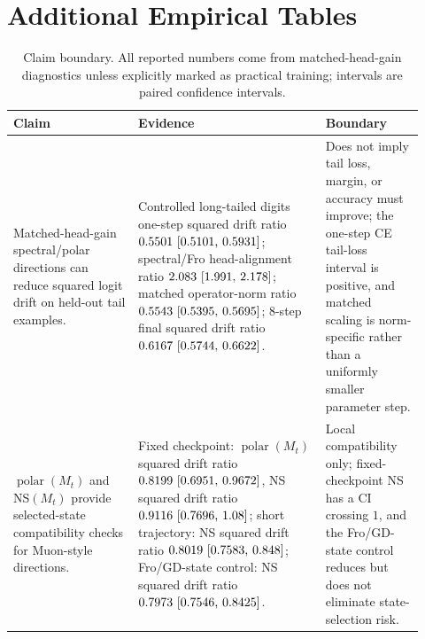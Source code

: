 \documentclass{article}
\theoremstyle{definition}
\newcommand{\polar}{\operatorname{polar}}
\begin{document}
\clearpage
\section{Additional Empirical Tables}
\label{app:appendix-tables}

\begin{table}[H]
\centering
\caption{Claim boundary. All reported numbers come from matched-head-gain diagnostics unless explicitly marked as practical training; intervals are paired confidence intervals.}
\label{tab:claim-boundary}
\footnotesize
\setlength{\tabcolsep}{2pt}
\begin{tabular}{@{}>{\raggedright\arraybackslash}p{0.28\linewidth}>{\raggedright\arraybackslash}p{0.42\linewidth}>{\raggedright\arraybackslash}p{0.22\linewidth}@{}}
\toprule
Claim & Evidence & Boundary \\
\midrule
Matched-head-gain spectral/polar directions can reduce squared logit drift on held-out tail examples. &
Controlled long-tailed digits one-step squared drift ratio \(0.5501 ~\text{[0.5101,\hspace{0.35em}0.5931]}\); spectral/Fro head-alignment ratio \(2.083 ~\text{[1.991,\hspace{0.35em}2.178]}\); matched operator-norm ratio \(0.5543 ~\text{[0.5395,\hspace{0.35em}0.5695]}\); 8-step final squared drift ratio \(0.6167 ~\text{[0.5744,\hspace{0.35em}0.6622]}\). &
Does not imply tail loss, margin, or accuracy must improve; the one-step CE tail-loss interval is positive, and matched scaling is norm-specific rather than a uniformly smaller parameter step. \\
\addlinespace
\(\polar(M_t)\) and NS\((M_t)\) provide selected-state compatibility checks for Muon-style directions. &
Fixed checkpoint: \(\polar(M_t)\) squared drift ratio \(0.8199 ~\text{[0.6951,\hspace{0.35em}0.9672]}\), NS squared drift ratio \(0.9116 ~\text{[0.7696,\hspace{0.35em}1.08]}\); short trajectory: NS squared drift ratio \(0.8019 ~\text{[0.7583,\hspace{0.35em}0.848]}\); Fro/GD-state control: NS squared drift ratio \(0.7973 ~\text{[0.7546,\hspace{0.35em}0.8425]}\). &
Local compatibility only; fixed-checkpoint NS has a CI crossing \(1\), and the Fro/GD-state control reduces but does not eliminate state-selection risk. \\

\end{tabular}
\end{table}
\end{document}
